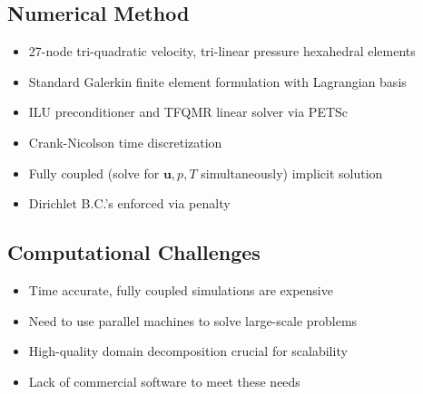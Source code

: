 \documentclass[compress,12pt]{beamer}
\newcommand{\bv}[1]{{\boldsymbol{#1}}}
\begin{document}
\subsection{Numerical Method}
\begin{frame}
  \begin{itemize}
    \item 27-node tri-quadratic velocity, tri-linear pressure hexahedral elements %
    \item Standard Galerkin finite element formulation with Lagrangian basis
    \item ILU preconditioner and TFQMR linear solver via PETSc
    \item Crank-Nicolson time discretization %
    \item Fully coupled (solve for $\bv{u}, p, T$ simultaneously) implicit solution
    \item Dirichlet B.C.'s enforced via penalty %
  \end{itemize}
\end{frame}



\subsection{Computational Challenges}
\begin{frame}
  \begin{itemize}
    \item Time accurate, fully coupled simulations are expensive
    \item Need to use parallel machines to solve large-scale problems
    \item High-quality domain decomposition crucial for scalability
    \item Lack of commercial software to meet these needs
  \end{itemize}
\end{frame}



\end{document}
